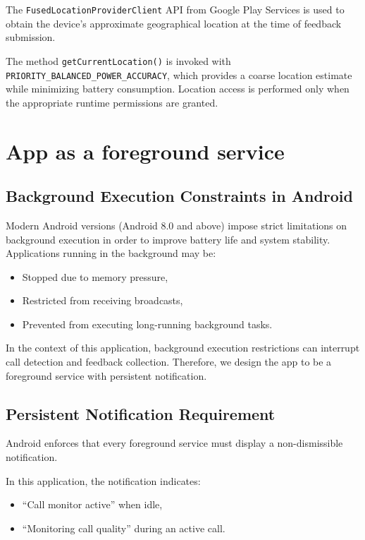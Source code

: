\documentclass{article}
\theoremstyle{plain}
\theoremstyle{definition}
\theoremstyle{remark}
\begin{document}
The \texttt{FusedLocationProviderClient} API from Google Play Services is used to obtain the device’s approximate geographical location at the time of feedback submission.

The method \texttt{getCurrentLocation()} is invoked with \texttt{PRIORITY\_BALANCED\_POWER\_ACCURACY}, which provides a coarse location estimate while minimizing battery consumption. Location access is performed only when the appropriate runtime permissions are granted.


\section{App as a foreground service}

\subsection{Background Execution Constraints in Android}

Modern Android versions (Android 8.0 and above) impose strict limitations on background execution in order to improve battery life and system stability. Applications running in the background may be:

\begin{itemize}
    \item Stopped due to memory pressure,
    \item Restricted from receiving broadcasts,
    \item Prevented from executing long-running background tasks.
\end{itemize}

In the context of this application, background execution restrictions can interrupt call detection and feedback collection. Therefore, we design the app to be a foreground service with persistent notification.

\subsection{Persistent Notification Requirement}

Android enforces that every foreground service must display a non-dismissible notification.

In this application, the notification indicates:

\begin{itemize}
    \item ``Call monitor active'' when idle,
    \item ``Monitoring call quality'' during an active call.
\end{itemize}
\end{document}
